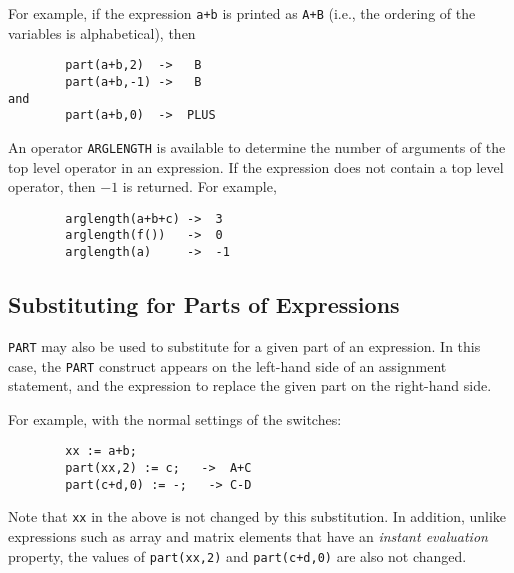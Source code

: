 For example, if the expression \texttt{a+b} is printed as \texttt{A+B} (i.e.,
the ordering of the variables is alphabetical), then
\begin{verbatim}
        part(a+b,2)  ->   B
        part(a+b,-1) ->   B
and
        part(a+b,0)  ->  PLUS
\end{verbatim}
\hypertarget{operator:ARGLENGTH}{}
An operator \texttt{ARGLENGTH} is available to determine
the number of arguments of the top level operator in an expression.  If
the expression does not contain a top level operator, then $-1$ is returned.
For example,
\begin{verbatim}
        arglength(a+b+c) ->  3
        arglength(f())   ->  0
        arglength(a)     ->  -1
\end{verbatim}

\subsection{Substituting for Parts of Expressions}

\texttt{PART} may also be used to substitute for a given part of an
expression.  In this case, the \texttt{PART} construct appears on the
left-hand side of an assignment statement, and the expression to replace
the given part on the right-hand side.

For example, with the normal settings of the {\REDUCE} switches:
\begin{verbatim}
        xx := a+b;
        part(xx,2) := c;   ->  A+C
        part(c+d,0) := -;   -> C-D
\end{verbatim}

Note that \texttt{xx} in the above is not changed by this substitution.  In
addition, unlike expressions such as array and matrix elements that have
an \emph{instant evaluation\/} property, the values
of \texttt{part(xx,2)} and \texttt{part(c+d,0)} are also not changed.

